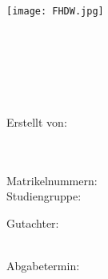 \begin{titlepage}
    \begin{center}
        \texttt{[image: FHDW.jpg]}\\\vspace{0.7cm}

        \Huge{\bfseries\documentType}\\
        ~\vspace{.3cm}

        \LARGE{\documentTitle}\\
        ~\vspace{1.3cm}

        \large{
            Erstellt von:\\
            \vspace{1.5mm}
            \documentAuthor \\

            \documentAuthorAdress \\
            \vspace{.5cm}

            Matrikelnummern: \matriculationNumber\\
            Studiengruppe: \studygroup \\

            \vspace{1cm}

            Gutachter: \\
            \vspace{1.5mm}
            \documentExaminer \\

            \vspace{.5cm}

            Abgabetermin: \\
            \vspace{1.5mm}
            \submissionDate
        }
    \end{center}
\end{titlepage}
